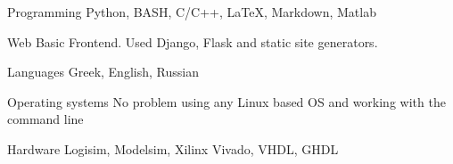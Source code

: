 


\begin{cvskills}


\cvskill
{Programming} %
{Python, BASH, C/C++, LaTeX, Markdown, Matlab} %


\cvskill
{Web} %
{Basic Frontend. Used Django, Flask and static site generators.} %


\cvskill
{Languages} %
{Greek, English, Russian} %


\cvskill
{Operating systems} %
{No problem using any Linux based OS and working with the command line} %


\cvskill
{Hardware} %
{Logisim, Modelsim, Xilinx Vivado, VHDL, GHDL} %

\end{cvskills}